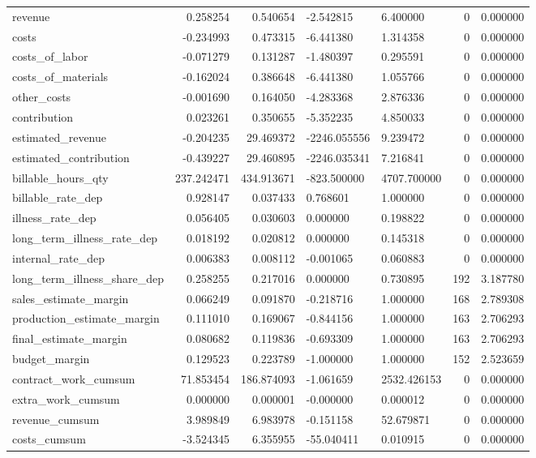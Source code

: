 \begin{landscape}
\begin{longtable}[h!]{lrrllrr}
revenue & 0.258254 & 0.540654 & -2.542815 & 6.400000 & 0 & 0.000000 \\
costs & -0.234993 & 0.473315 & -6.441380 & 1.314358 & 0 & 0.000000 \\
costs_of_labor & -0.071279 & 0.131287 & -1.480397 & 0.295591 & 0 & 0.000000 \\
costs_of_materials & -0.162024 & 0.386648 & -6.441380 & 1.055766 & 0 & 0.000000 \\
other_costs & -0.001690 & 0.164050 & -4.283368 & 2.876336 & 0 & 0.000000 \\
contribution & 0.023261 & 0.350655 & -5.352235 & 4.850033 & 0 & 0.000000 \\
estimated_revenue & -0.204235 & 29.469372 & -2246.055556 & 9.239472 & 0 & 0.000000 \\
estimated_contribution & -0.439227 & 29.460895 & -2246.035341 & 7.216841 & 0 & 0.000000 \\
billable_hours_qty & 237.242471 & 434.913671 & -823.500000 & 4707.700000 & 0 & 0.000000 \\
billable_rate_dep & 0.928147 & 0.037433 & 0.768601 & 1.000000 & 0 & 0.000000 \\
illness_rate_dep & 0.056405 & 0.030603 & 0.000000 & 0.198822 & 0 & 0.000000 \\
long_term_illness_rate_dep & 0.018192 & 0.020812 & 0.000000 & 0.145318 & 0 & 0.000000 \\
internal_rate_dep & 0.006383 & 0.008112 & -0.001065 & 0.060883 & 0 & 0.000000 \\
long_term_illness_share_dep & 0.258255 & 0.217016 & 0.000000 & 0.730895 & 192 & 3.187780 \\
sales_estimate_margin & 0.066249 & 0.091870 & -0.218716 & 1.000000 & 168 & 2.789308 \\
production_estimate_margin & 0.111010 & 0.169067 & -0.844156 & 1.000000 & 163 & 2.706293 \\
final_estimate_margin & 0.080682 & 0.119836 & -0.693309 & 1.000000 & 163 & 2.706293 \\
budget_margin & 0.129523 & 0.223789 & -1.000000 & 1.000000 & 152 & 2.523659 \\
contract_work_cumsum & 71.853454 & 186.874093 & -1.061659 & 2532.426153 & 0 & 0.000000 \\
extra_work_cumsum & 0.000000 & 0.000001 & -0.000000 & 0.000012 & 0 & 0.000000 \\
revenue_cumsum & 3.989849 & 6.983978 & -0.151158 & 52.679871 & 0 & 0.000000 \\
costs_cumsum & -3.524345 & 6.355955 & -55.040411 & 0.010915 & 0 & 0.000000 \\

\end{longtable}
\end{landscape}
